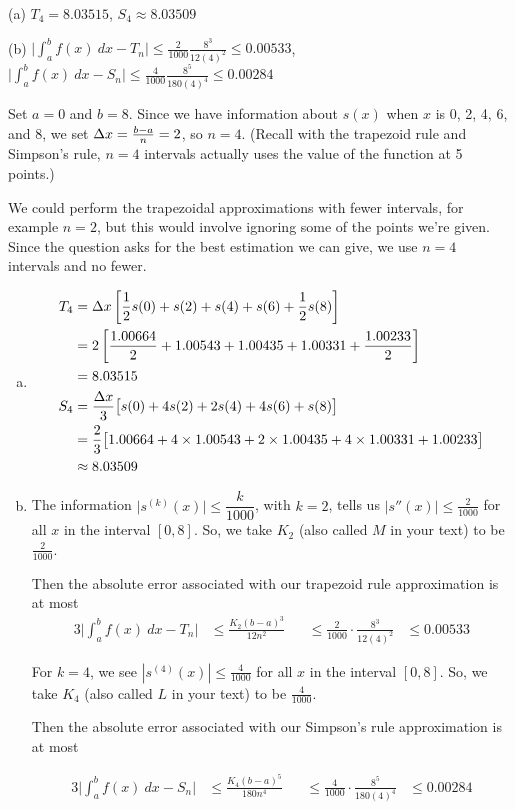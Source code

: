 \begin{answer}
(a)  $T_4=8.03515$, $S_4\approx 8.03509$

\noindent
(b) $\displaystyle\Big|\int_a^b f(x)\ dx -T_n\Big|
                \le \frac{2}{1000}\frac{8^3}{12(4)^2} \le0.00533$,\quad
$\displaystyle\Big|\int_a^b f(x)\ dx -S_n\Big|
                 \le   \frac{4}{1000}\frac{8^5}{180(4)^4}\le0.00284$

\end{answer}

\begin{solution}
Set $a=0$ and $b=8$. Since we have information about $s(x)$ when $x$ is 0, 2, 4, 6, and 8, we set  $\Delta x=\frac{b-a}{n}=2$, so $n=4$. (Recall with the trapezoid rule and Simpson's rule, $n=4$ intervals actually uses the value of the function at 5 points.)

We could perform the trapezoidal approximations with fewer intervals, for example $n=2$, but this would involve ignoring some of the points we're given. Since the question asks for the best estimation we can give, we use $n=4$ intervals and no fewer.
\begin{enumerate}[(a)]
\item

\begin{align*}
T_4&={\Delta x}\left[\frac{1}{2}s(0)+s(2)+s(4)+s(6)+\frac{1}{2}s(8)\right]\\
&=2\left[\frac{1.00664}{2}+1.00543+ 1.00435+1.00331+ \frac{1.00233}{2}\right]\\
&=8.03515
\\
S_4&=\frac{\Delta x}{3}\big[s(0)+4s(2)+2s(4)+4s(6)+s(8)\big]\\
&=\frac{2}{3}\big[1.00664+4\times 1.00543+2\times 1.00435+4\times1.00331+ 1.00233\big]\\
&\approx 8.03509
\end{align*}

\item
The information $\big|s^{(k)}(x)\big|\le \dfrac{k}{1000}$, with $k=2$, tells us $|s''(x)|\leq \frac{2}{1000}$ for all $x$ in the interval $[0,8]$. So, we take $K_2$ (also called $M$ in your text) to be $\frac{2}{1000}$.

Then the absolute error associated with our trapezoid rule approximation is at most
\begin{alignat*}{3}
\bigg|\int_a^b f(x)\ dx -T_n\bigg|&\le \frac{K_2(b-a)^3}{12n^2}
&&\le \frac{2}{1000}\cdot\frac{8^3}{12(4)^2}
&\le 0.00533
\end{alignat*}

For $k=4$, we see $|s^{(4)}(x)|\leq \frac{4}{1000}$ for all $x$ in the interval $[0,8]$. So, we take $K_4$ (also called $L$ in your text) to be $\frac{4}{1000}$.

Then the absolute error associated with our Simpson's rule approximation is at most

\begin{alignat*}{3}
\bigg|\int_a^b f(x)\ dx -S_n\bigg|&\le \frac{K_4(b-a)^5}{180n^4}
&&\le \frac{4}{1000}\cdot\frac{8^5}{180(4)^4}
&\le0.00284
\end{alignat*}
\end{enumerate}
\end{solution}
